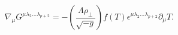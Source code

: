 \begin{equation}\label{bulk_Ramond-Ramond}
\nabla_{\mu}G^{\mu\lambda_{2}\ldots\lambda_{p+2}} =
-\left({\frac{\Lambda\rho_{\perp}}{\sqrt{-g}}}\right) f(T)
\epsilon^{\mu\lambda_{2}\ldots\lambda_{p+2}}\partial_{\mu}T.
\end{equation}

